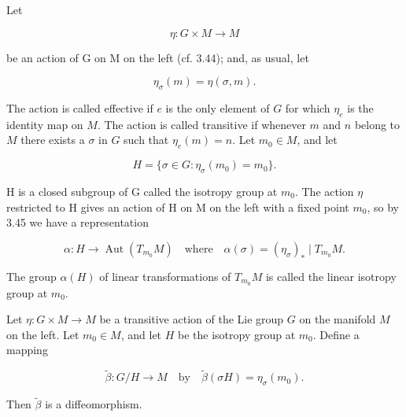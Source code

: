 \begin{definition}\label{thm:3.61}
Let

\begin{equation}
\tag{1}\label{eq:3.61:1}
\eta\colon G\times M\to M
\end{equation}

be an action of G on M on the left (cf. 3.44); and, as usual, let

\begin{equation}
\tag{2}\label{eq:3.61:2}
\eta_{\sigma}(m)=\eta(\sigma,m).
\end{equation}

The action is called effective if $e$ is the only element of $G$ for which $\eta_{e}$ is the identity map on $M$. The action is called transitive if whenever $m$ and $n$ belong to $M$ there exists a $\sigma$ in $G$ such that $\eta_{e}(m) = n$. Let $m_{0} \in M$, and let 

\begin{equation}
\tag{3}\label{eq:3.61:3}
H=\{\sigma\in G\colon\eta_{\sigma}(m_{0})=m_{0}\}.
\end{equation}

H is a closed subgroup of G called the isotropy group at  $ m_{0} $. The action  $ \eta $ restricted to H gives an action of H on M on the left with a fixed point  $ m_{0} $, so by 3.45 we have a representation 

\begin{equation}
\tag{4}\label{eq:3.61:4}
\alpha\colon H\to\operatorname{Aut}(T_{m_{0}} M)\quad\mathrm{where}\quad\alpha(\sigma)=(\eta_{\sigma})_{*}\mid T_{m_{0}} M.
\end{equation}

The group  $ \alpha(H) $ of linear transformations of  $ T_{m_{0}} M $ is called the linear isotropy group at  $ m_{0} $. 

\end{definition}

\begin{theorem}\label{thm:3.62}
Let $\eta: G \times M \to M$ be a transitive action of the Lie group $G$ on the manifold $M$ on the left. Let $m_0 \in M$, and let $H$ be the isotropy group at $m_0$. Define a mapping 

\begin{equation}
\tag{1}\label{eq:3.62:1}
\tilde{\beta}\colon G/H\to M\quad\mathrm{by}\quad\tilde{\beta}(\sigma H)=\eta_{\sigma}(m_{0}).
\end{equation}

Then  $ \tilde{\beta} $ is a diffeomorphism.

\end{theorem}

